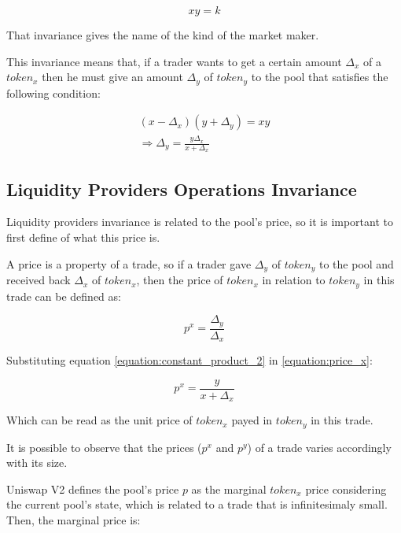 \documentclass{article}
\begin{document}
\begin{equation}
    \label{equation:constant_product}
    xy=k
\end{equation}

That invariance gives the name of the kind of the market maker.

This invariance means that, if a trader wants to get a certain amount $\Delta_x$ of a $token_x$ then he must give an amount $\Delta_y$ of $token_y$ to the pool that satisfies the following condition:

\begin{equation}
    \label{equation:constant_product_2}
    \begin{split}
        (x - \Delta_x)(y + \Delta_y)=xy \\
        \Rightarrow \Delta_y=\frac{y\Delta_x}{x + \Delta_x}
    \end{split}
\end{equation}

\subsection{Liquidity Providers Operations Invariance}
\label{section:liquidity_providers_invariance}

Liquidity providers invariance is related to the pool's price, so it is important to first define of what this price is.

A price is a property of a trade, so if a trader gave $\Delta_y$ of $token_y$ to the pool and received back $\Delta_x$ of $token_x$, then the price of $token_x$ in relation to $token_y$ in this trade can be defined as:

\begin{equation}
    \label{equation:price_x}
    p^x=\frac{\Delta_y}{\Delta_x}
\end{equation}

Substituting equation \ref{equation:constant_product_2} in \ref{equation:price_x}:

\begin{equation}
    \label{equation:price_x_2}
    p^x=\frac{y}{x+\Delta_x}
\end{equation}

Which can be read as the unit price of $token_x$ payed in $token_y$ in this trade.

It is possible to observe that the prices ($p^x$ and $p^y$) of a trade varies accordingly with its size.

Uniswap V2 defines the pool's price $p$ as the marginal $token_x$ price considering the current pool's state, which is related to a trade that is infinitesimaly small.
Then, the marginal price is:
\end{document}

